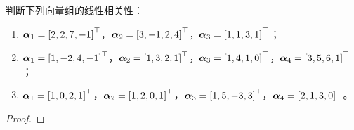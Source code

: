 \begin{problem}\label{problem-2.25}
判断下列向量组的线性相关性：
\begin{enumerate}
    \item \(\vecal_1=\myvec{2,2,7,-1}\)，\(\vecal_2=\myvec{3,-1,2,4}\)，\(\vecal_3=\myvec{1,1,3,1}\)；
    \item \(\vecal_1=\myvec{1,-2,4,-1}\)，\(\vecal_2=\myvec{1,3,2,1}\)，\(\vecal_3=\myvec{1,4,1,0}\)，\(\vecal_4=\myvec{3,5,6,1}\)；
    \item \(\vecal_1=\myvec{1,0,2,1}\)，\(\vecal_2=\myvec{1,2,0,1}\)，\(\vecal_3=\myvec{1,5,-3,3}\)，\(\vecal_4=\myvec{2,1,3,0}\)。
\end{enumerate}
\end{problem}
\begin{proof}
\end{proof}

